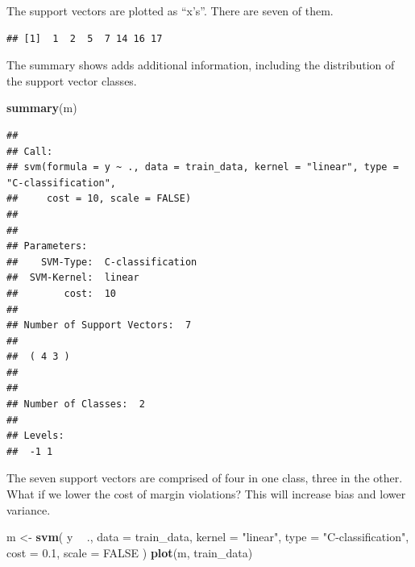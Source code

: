 \documentclass[]{book}
\newenvironment{Shaded}{\begin{snugshade}}{\end{snugshade}}
\newcommand{\DataTypeTok}[1]{\textcolor[rgb]{0.13,0.29,0.53}{#1}}
\newcommand{\FloatTok}[1]{\textcolor[rgb]{0.00,0.00,0.81}{#1}}
\newcommand{\KeywordTok}[1]{\textcolor[rgb]{0.13,0.29,0.53}{\textbf{#1}}}
\newcommand{\NormalTok}[1]{#1}
\newcommand{\OperatorTok}[1]{\textcolor[rgb]{0.81,0.36,0.00}{\textbf{#1}}}
\newcommand{\OtherTok}[1]{\textcolor[rgb]{0.56,0.35,0.01}{#1}}
\newcommand{\StringTok}[1]{\textcolor[rgb]{0.31,0.60,0.02}{#1}}
\begin{document}
The support vectors are plotted as ``x's''. There are seven of them.

\begin{Shaded}
\end{Shaded}

\begin{verbatim}
## [1]  1  2  5  7 14 16 17
\end{verbatim}

The summary shows adds additional information, including the distribution of the support vector classes.

\begin{Shaded}
\begin{Highlighting}[]
\KeywordTok{summary}\NormalTok{(m)}
\end{Highlighting}
\end{Shaded}

\begin{verbatim}
## 
## Call:
## svm(formula = y ~ ., data = train_data, kernel = "linear", type = "C-classification", 
##     cost = 10, scale = FALSE)
## 
## 
## Parameters:
##    SVM-Type:  C-classification 
##  SVM-Kernel:  linear 
##        cost:  10 
## 
## Number of Support Vectors:  7
## 
##  ( 4 3 )
## 
## 
## Number of Classes:  2 
## 
## Levels: 
##  -1 1
\end{verbatim}

The seven support vectors are comprised of four in one class, three in the other. What if we lower the cost of margin violations? This will increase bias and lower variance.

\begin{Shaded}
\begin{Highlighting}[]
\NormalTok{m <-}\StringTok{ }\KeywordTok{svm}\NormalTok{(}
\NormalTok{  y }\OperatorTok{~}\StringTok{ }\NormalTok{., }
  \DataTypeTok{data =}\NormalTok{ train_data,}
  \DataTypeTok{kernel =} \StringTok{"linear"}\NormalTok{,}
  \DataTypeTok{type =} \StringTok{"C-classification"}\NormalTok{,  }
  \DataTypeTok{cost =} \FloatTok{0.1}\NormalTok{,}
  \DataTypeTok{scale =} \OtherTok{FALSE}
\NormalTok{)}
\KeywordTok{plot}\NormalTok{(m, train_data)}
\end{Highlighting}
\end{Shaded}
\end{document}

